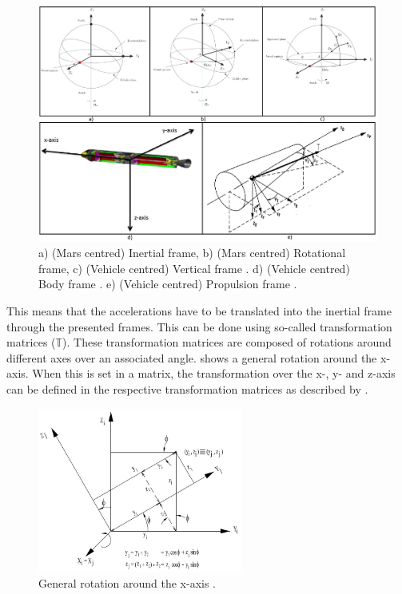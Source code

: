 \begin{figure}[!ht]
\centering
\includegraphics[width=1.0\textwidth]{figures/reference_frames/allFiveReferenceFrames_mooij2013fd-trinidad2012-mooij1994motion.jpg}
\caption{a) (Mars centred) Inertial frame, b) (Mars centred) Rotational frame, c) (Vehicle centred) Vertical frame \citep{mooij2013fd}. d) (Vehicle centred) Body frame \citep{trinidad2012}. e) (Vehicle centred) Propulsion frame \citep{mooij1994motion}.}
\label{fig:allFiveReferenceFrames_mooij2013fd-trinidad2012-mooij1994motion}
\end{figure}

This means that the accelerations have to be translated into the inertial frame through the presented frames. This can be done using so-called transformation matrices ($\mathbb{T}$). These transformation matrices are composed of rotations around different axes over an associated angle.  shows a general rotation around the x-axis. When this is set in a matrix, the transformation over the x-, y- and z-axis can be defined in the respective transformation matrices as described by . 


\begin{figure}[!ht]
\centering
\includegraphics[width=0.6\textwidth]{figures/reference_frames/xtrans_mooij2013stat.jpg}
\caption{General rotation around the x-axis \cite{mooij2013stat}.}
\label{fig:exampleXtrans_mooij2013stat}
\end{figure}


